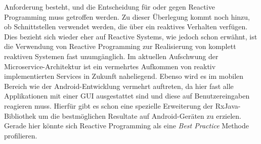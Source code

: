 Anforderung besteht, und die Entscheidung für oder gegen Reactive Programming muss getroffen werden. Zu dieser Überlegung kommt noch hinzu, ob Schnittstellen verwendet werden, die über ein reaktives Verhalten verfügen. Dies bezieht sich wieder eher auf Reactive Systems, wie jedoch schon erwähnt, ist die Verwendung von Reactive Programming zur Realisierung von komplett reaktiven Systemen fast unumgänglich. Im aktuellen Aufschwung der Microservice-Architektur ist ein vermehrtes Aufkommen von reaktiv implementierten Services in Zukunft naheliegend. Ebenso wird es im mobilen Bereich wie der Android-Entwicklung vermehrt auftreten, da hier fast alle Applikationen mit einer GUI ausgestattet sind und diese auf Benutzereingaben reagieren muss. Hierfür gibt es schon eine spezielle Erweiterung der RxJava-Bibliothek um die bestmöglichen Resultate auf Android-Geräten zu erzielen. Gerade hier könnte sich Reactive Programming als eine \textit{Best Practice} Methode profilieren.
